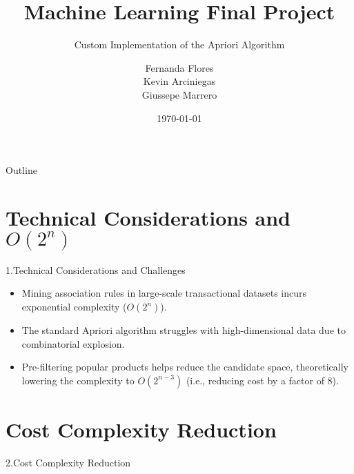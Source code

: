 \documentclass{beamer}
\title{Machine Learning Final Project}
\subtitle{Custom Implementation of the Apriori Algorithm}
\author{
\begin{tabular}{c} 
Fernanda Flores \\ 
Kevin Arciniegas \\ 
Giussepe Marrero
\end{tabular}
}
\institute{4Geeks Academy}
\date{\today}
\begin{document}
\begin{frame}
    \titlepage
\end{frame}

\begin{frame}{Outline}
    \tableofcontents
\end{frame}

\section{Technical Considerations and \texorpdfstring{$O(2^n)$}{O(2^n)}}

\begin{frame}{1.Technical Considerations and Challenges}
    \begin{itemize}
        \item Mining association rules in large-scale transactional datasets incurs exponential complexity (\(O(2^n)\)).
        \item The standard Apriori algorithm struggles with high-dimensional data due to combinatorial explosion.
        \item Pre-filtering popular products helps reduce the candidate space, theoretically lowering the complexity to \(O(2^{n-3})\) (i.e., reducing cost by a factor of 8).
    \end{itemize}
\end{frame}

\section{Cost Complexity Reduction}

\begin{frame}{2.Cost Complexity Reduction}
    \centering
\end{frame}
    
\end{document}
